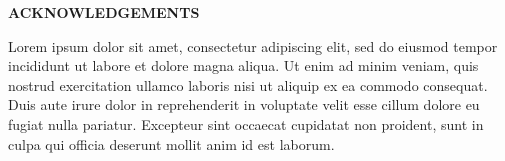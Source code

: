 \clearpage
{}
\begin{centering}
\textbf{ACKNOWLEDGEMENTS}\\
\vspace{\baselineskip}
\end{centering}

Lorem ipsum dolor sit amet, consectetur adipiscing elit, sed do eiusmod tempor incididunt ut labore et dolore magna aliqua. Ut enim ad minim veniam, quis nostrud exercitation ullamco laboris nisi ut aliquip ex ea commodo consequat. Duis aute irure dolor in reprehenderit in voluptate velit esse cillum dolore eu fugiat nulla pariatur. Excepteur sint occaecat cupidatat non proident, sunt in culpa qui officia deserunt mollit anim id est laborum.

\thispagestyle{empty}
\clearpage
